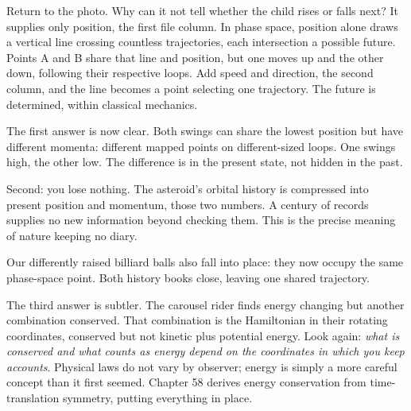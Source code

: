 \begin{center}
\end{center}


Return to the photo. Why can it not tell whether the child rises or falls next? It supplies only position, the first file column. In phase space, position alone draws a vertical line crossing countless trajectories, each intersection a possible future. Points A and B share that line and position, but one moves up and the other down, following their respective loops. Add speed and direction, the second column, and the line becomes a point selecting one trajectory. The future is determined, within classical mechanics.

The first answer is now clear. Both swings can share the lowest position but have different momenta: different mapped points on different-sized loops. One swings high, the other low. The difference is in the present state, not hidden in the past.

Second: you lose nothing. The asteroid's orbital history is compressed into present position and momentum, those two numbers. A century of records supplies no new information beyond checking them. This is the precise meaning of nature keeping no diary.

Our differently raised billiard balls also fall into place: they now occupy the same phase-space point. Both history books close, leaving one shared trajectory.

The third answer is subtler. The carousel rider finds energy changing but another combination conserved. That combination is the Hamiltonian in their rotating coordinates, conserved but not kinetic plus potential energy. Look again: \emph{what is conserved and what counts as energy depend on the coordinates in which you keep accounts}. Physical laws do not vary by observer; energy is simply a more careful concept than it first seemed. Chapter 58 derives energy conservation from time-translation symmetry, putting everything in place.


